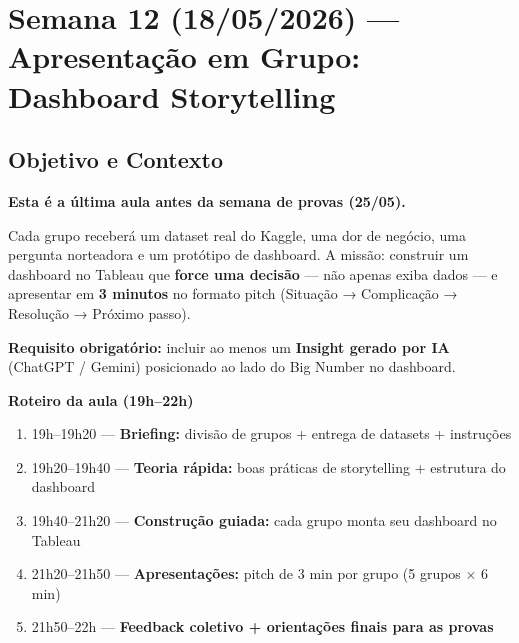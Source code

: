 
\chapter{Semana 12 (18/05/2026) — Apresentação em Grupo: Dashboard Storytelling}

\section{Objetivo e Contexto}

\begin{NoteBox}
\textbf{Esta é a última aula antes da semana de provas (25/05).}

Cada grupo receberá um dataset real do Kaggle, uma dor de negócio, uma pergunta
norteadora e um protótipo de dashboard. A missão: construir um dashboard no Tableau
que \textbf{force uma decisão} — não apenas exiba dados — e apresentar em
\textbf{3 minutos} no formato pitch (Situação → Complicação → Resolução → Próximo passo).

\textbf{Requisito obrigatório:} incluir ao menos um \textbf{Insight gerado por IA}
(ChatGPT / Gemini) posicionado ao lado do Big Number no dashboard.
\end{NoteBox}

\begin{BoardBox}
\textbf{Roteiro da aula (19h–22h)}
\begin{enumerate}
  \item 19h–19h20 — \textbf{Briefing:} divisão de grupos + entrega de datasets + instruções
  \item 19h20–19h40 — \textbf{Teoria rápida:} boas práticas de storytelling + estrutura do dashboard
  \item 19h40–21h20 — \textbf{Construção guiada:} cada grupo monta seu dashboard no Tableau
  \item 21h20–21h50 — \textbf{Apresentações:} pitch de 3 min por grupo (5 grupos × 6 min)
  \item 21h50–22h — \textbf{Feedback coletivo + orientações finais para as provas}
\end{enumerate}
\end{BoardBox}

